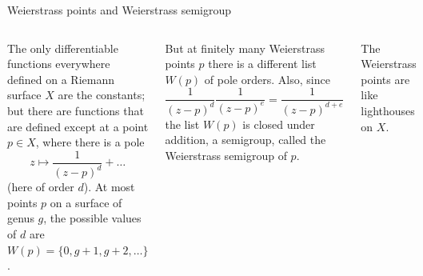 \documentclass[12pt, aspectratio=169]{beamer}
\begin{document}
\begin{frame}{Weierstrass points and Weierstrass semigroup}
\begin{columns}
 The only differentiable functions
 everywhere defined on a Riemann surface $X$ are the constants;
 but there are functions that are defined except
 at a point $p\in X$, where there is a pole 
 $$
 z\mapsto \frac{1}{(z-p)^d} + \dots
 $$
 (here of order $d$). At most points $p$ on a surface of
 genus $g$, the possible values of $d$ are
$W(p) = \{0, g+1,g+2,\dots\}$.

But at finitely many \alert{Weierstrass points} $p$
there is a different list $W(p)$ of pole orders. Also, since
$$
\frac{1}{(z-p)^d}\frac{1}{(z-p)^e} = \frac{1}{(z-p)^{d+e}}
$$
the list $W(p)$ is closed under addition, a \alert{semigroup},
called the \alert{Weierstrass semigroup} of $p$.

\bigskip

The Weierstrass points are like lighthouses on $X$.
\end{columns}
 
\end{frame}
\end{document}
